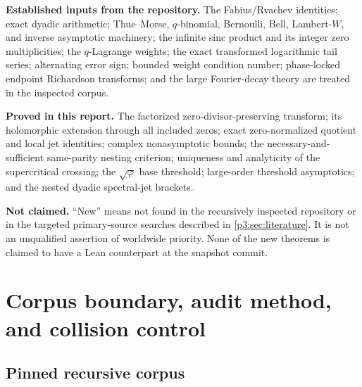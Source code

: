 \documentclass[11pt]{article}
\numberwithin{equation}{section}
\theoremstyle{definition}
\theoremstyle{remark}
\begin{document}
\begin{abstract}
Numerical experiments, supplied as a fully commented Python program, independently compare
direct products with the exact coefficient series, compute the threshold curve and unique
crossings, and demonstrate derivative-ratio errors below $10^{-24}$ at the multiplicity-five
zero $x=48$ by order eight.  The final sections formulate conjectures and a formalization
program for general refinement masks, complex boundary continuation, optimal finite
precision, inverse-Fabius coupling, and periodically perturbed Lambert saddles.
\end{abstract}

\begin{statusboxPartl}
\textbf{Established inputs from the repository.}  The Fabius/Rvachev identities; exact
dyadic arithmetic; Thue--Morse, $q$-binomial, Bernoulli, Bell, Lambert-$W$, and inverse
asymptotic machinery; the infinite sinc product and its integer zero multiplicities; the
$q$-Lagrange weights; the exact transformed logarithmic tail series; alternating error
sign; bounded weight condition number; phase-locked endpoint Richardson transforms; and the
large Fourier-decay theory are treated in the inspected corpus.

\textbf{Proved in this report.}  The factorized zero-divisor-preserving transform; its
holomorphic extension through all included zeros; exact zero-normalized quotient and local
jet identities; complex nonasymptotic bounds; the necessary-and-sufficient same-parity
nesting criterion; uniqueness and analyticity of the supercritical crossing; the
$\sqrt\varphi$ base threshold; large-order threshold asymptotics; and the nested dyadic
spectral-jet brackets.

\textbf{Not claimed.}  ``New'' means not found in the recursively inspected repository or
in the targeted primary-source searches described in \cref{p3:sec:literature}.  It is not an
unqualified assertion of worldwide priority.  None of the new theorems is claimed to have
a Lean counterpart at the snapshot commit.
\end{statusboxPartl}

\clearpage

\clearpage

\section{Corpus boundary, audit method, and collision control}\label{p3:sec:audit}

\subsection{Pinned recursive corpus}
\end{document}
